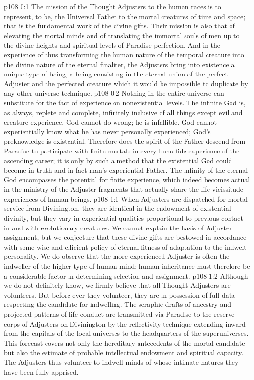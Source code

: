\author{Solitary Messenger}
\vs p108 0:1 The mission of the Thought Adjusters to the human races is to represent, to be, the Universal Father to the mortal creatures of time and space; that is the fundamental work of the divine gifts. Their mission is also that of elevating the mortal minds and of translating the immortal souls of men up to the divine heights and spiritual levels of Paradise perfection. And in the experience of thus transforming the human nature of the temporal creature into the divine nature of the eternal finaliter, the Adjusters bring into existence a unique type of being, a being consisting in the eternal union of the perfect Adjuster and the perfected creature which it would be impossible to duplicate by any other universe technique.
\vs p108 0:2 \pc Nothing in the entire universe can substitute for the fact of experience on nonexistential levels. The infinite God is, as always, replete and complete, infinitely inclusive of all things except evil and creature experience. God cannot do wrong; he is infallible. God cannot experientially know what he has never personally experienced; God’s preknowledge is existential. Therefore does the spirit of the Father descend from Paradise to participate with finite mortals in every bona fide experience of the ascending career; it is only by such a method that the existential God could become in truth and in fact man’s experiential Father. The infinity of the eternal God encompasses the potential for finite experience, which indeed becomes actual in the ministry of the Adjuster fragments that actually share the life vicissitude experiences of human beings.
\vs p108 1:1 When Adjusters are dispatched for mortal service from Divinington, they are identical in the endowment of existential divinity, but they vary in experiential qualities proportional to previous contact in and with evolutionary creatures. We cannot explain the basis of Adjuster assignment, but we conjecture that these divine gifts are bestowed in accordance with some wise and efficient policy of eternal fitness of adaptation to the indwelt personality. We do observe that the more experienced Adjuster is often the indweller of the higher type of human mind; human inheritance must therefore be a considerable factor in determining selection and assignment.
\vs p108 1:2 Although we do not definitely know, we firmly believe that all Thought Adjusters are volunteers. But before ever they volunteer, they are in possession of full data respecting the candidate for indwelling. The seraphic drafts of ancestry and projected patterns of life conduct are transmitted via Paradise to the reserve corps of Adjusters on Divinington by the reflectivity technique extending inward from the capitals of the local universes to the headquarters of the superuniverses. This forecast covers not only the hereditary antecedents of the mortal candidate but also the estimate of probable intellectual endowment and spiritual capacity. The Adjusters thus volunteer to indwell minds of whose intimate natures they have been fully apprised.
